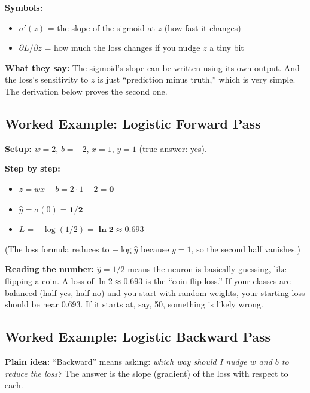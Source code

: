 \textbf{Symbols:}
\begin{itemize}
  \item $\sigma'(z)$ = the slope of the sigmoid at $z$ (how fast it changes)
  \item $\partial L / \partial z$ = how much the loss changes if you nudge $z$ a tiny bit
\end{itemize}

\textbf{What they say:} The sigmoid's slope can be written using its own output. And the loss's sensitivity to $z$ is just ``prediction minus truth,'' which is very simple. The derivation below proves the second one.

\subsection*{Worked Example: Logistic Forward Pass}

\textbf{Setup:} $w = 2$, $b = -2$, $x = 1$, $y = 1$ (true answer: yes).

\textbf{Step by step:}
\begin{itemize}
  \item $z = wx + b = 2 \cdot 1 - 2 = \mathbf{0}$
  \item $\hat{y} = \sigma(0) = \mathbf{1/2}$
  \item $L = -\log(1/2) = \mathbf{\ln 2 \approx 0.693}$
\end{itemize}

(The loss formula reduces to $-\log \hat{y}$ because $y = 1$, so the second half vanishes.)

\textbf{Reading the number:} $\hat{y} = 1/2$ means the neuron is basically guessing, like flipping a coin. A loss of $\ln 2 \approx 0.693$ is the ``coin flip loss.'' If your classes are balanced (half yes, half no) and you start with random weights, your starting loss should be near 0.693. If it starts at, say, 50, something is likely wrong.

\subsection*{Worked Example: Logistic Backward Pass}

\textbf{Plain idea:} ``Backward'' means asking: \emph{which way should I nudge $w$ and $b$ to reduce the loss?} The answer is the slope (gradient) of the loss with respect to each.

